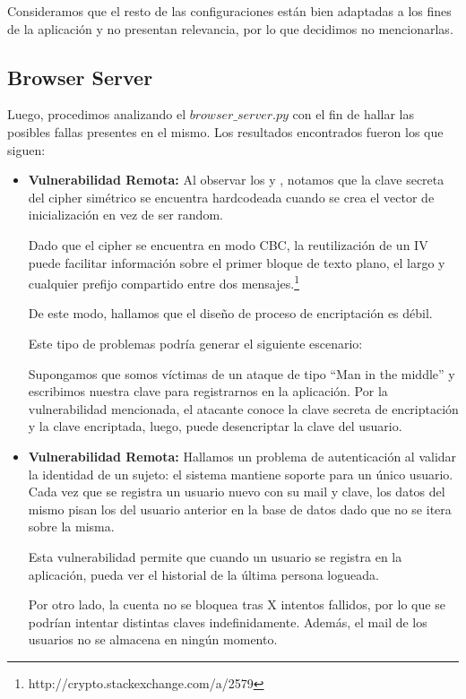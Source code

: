 \documentclass[10pt, a4paper]{article}
\begin{document}
Consideramos que el resto de las configuraciones están bien adaptadas a los fines de la aplicación y no presentan relevancia, por lo que decidimos no mencionarlas.

\newpage
\subsection{Browser Server}
Luego, procedimos analizando el $browser\_server.py$ con el fin de hallar las posibles fallas presentes en el mismo. Los resultados encontrados fueron los que siguen:

\begin{itemize}

\item \textbf{Vulnerabilidad Remota:} Al observar los  y , notamos que la clave secreta del cipher simétrico se encuentra hardcodeada cuando se crea el vector de inicialización en vez de ser random.

Dado que el cipher se encuentra en modo CBC, la reutilización de un IV puede facilitar información sobre el primer bloque de texto plano, el largo y cualquier prefijo compartido entre dos mensajes.\footnote{http://crypto.stackexchange.com/a/2579}

De este modo, hallamos que el diseño de proceso de encriptación es débil.

Este tipo de problemas podría generar el siguiente escenario:

Supongamos que somos víctimas de un ataque de tipo ``Man in the middle'' y escribimos nuestra clave para registrarnos en la aplicación. Por la vulnerabilidad mencionada, el atacante conoce la clave secreta de encriptación y la clave encriptada, luego, puede desencriptar la clave del usuario.

\item \textbf{Vulnerabilidad Remota:} Hallamos un problema de autenticación al validar la identidad de un sujeto: el sistema mantiene soporte para un único usuario. Cada vez que se registra un usuario nuevo con su mail y clave, los datos del mismo pisan los del usuario anterior en la base de datos dado que no se itera sobre la misma.

Esta vulnerabilidad permite que cuando un usuario se registra en la aplicación, pueda ver el historial de la última persona logueada.

Por otro lado, la cuenta no se bloquea tras X intentos fallidos, por lo que se podrían intentar distintas claves indefinidamente. Además, el mail de los usuarios no se almacena en ningún momento. 




\end{itemize}
\end{document}
